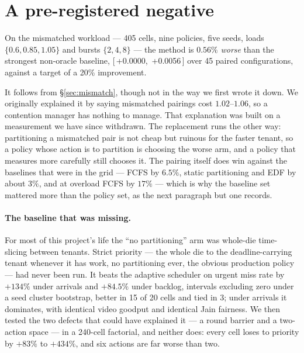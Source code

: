 \documentclass[sigconf,nonacm]{acmart}
\newcommand{\ci}[2]{[\,#1,\ #2\,]}
\begin{document}
\section{A pre-registered negative}
\label{sec:negative}

On the mismatched workload --- 405 cells, nine policies, five seeds,
loads $\{0.6,0.85,1.05\}$ and bursts $\{2,4,8\}$ --- the method is
$0.56\%$ \emph{worse} than the strongest non-oracle baseline,
\ci{+0.0000}{+0.0056} over 45 paired configurations, against a target of
a 20\% improvement.

It follows from \S\ref{sec:mismatch}, though not in the way we first
wrote it down. We originally explained it by saying mismatched pairings
cost $1.02$--$1.06$, so a contention manager has nothing to manage. That
explanation was built on a measurement we have since withdrawn. The
replacement runs the other way: partitioning a mismatched pair is not
cheap but ruinous for the faster tenant, so a policy whose action is to
partition is choosing the worse arm, and a policy that measures more
carefully still chooses it. The pairing itself does win against the
baselines that were in the grid --- FCFS by $6.5\%$, static partitioning
and EDF by about $3\%$, and at overload FCFS by $17\%$ --- which is why
the baseline set mattered more than the policy set, as the next
paragraph but one records.

\paragraph{The baseline that was missing.} For most of this project's
life the ``no partitioning'' arm was whole-die time-slicing between
tenants. Strict priority --- the whole die to the deadline-carrying
tenant whenever it has work, no partitioning ever, the obvious production
policy --- had never been run. It beats the adaptive scheduler on urgent
miss rate by $+134\%$ under arrivals and $+84.5\%$ under backlog,
intervals excluding zero under a seed cluster bootstrap, better in 15 of
20 cells and tied in 3; under arrivals it dominates, with identical video
goodput and identical Jain fairness. We then tested the two defects that
could have explained it --- a round barrier and a two-action space --- in
a 240-cell factorial, and neither does: every cell loses to priority by
$+83\%$ to $+434\%$, and six actions are far worse than two.
\end{document}
